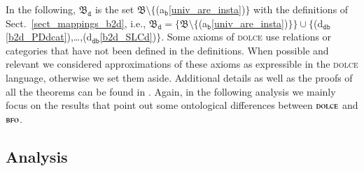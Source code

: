 \documentclass[ao]{iosart2x}
\newcommand{\nb}[1]{\textcolor{red}{$|$}\marginpar{\hspace*{-0cm}\parbox{20mm}{\scriptsize\raggedright\textcolor{red}{#1}}}}
\newcommand{\bfoAxLabel}{\textrm{a$_\texttt{b}$}}
\newcommand{\dbDefLabel}{\textrm{d$_\texttt{db}$}}
\newcommand{\refbfoax}[1]{({\bfoAxLabel}\ref{#1})}
\newcommand{\refdbdf}[1]{({\dbDefLabel}\ref{#1})}
\newcommand{\dolce}{{\textsc{dolce}}}
\newcommand{\bfo}{{\textsc{bfo}}}
\newcommand {\thbfo} {\ensuremath{\mathfrak{B}}}
\newcommand {\dbmap} {\ensuremath{\mathfrak{M}_\texttt{db}}}
\newcommand {\bdmap} {\ensuremath{\mathfrak{M}_\texttt{bd}}}
\newcommand {\thbfobdmap} {\ensuremath{\mathfrak{B}_\texttt{d}}}
\begin{document}
In the following, $\thbfobdmap$ is the set $\thbfo{\setminus}\{$\refbfoax{univ_are_insta}$\}$ with the definitions of Sect.~\ref{sect_mappings_b2d}, %
i.e., $\thbfobdmap = \{\thbfo{\setminus}\{$\refbfoax{univ_are_insta}$\}\} \cup \{$\refdbdf{b2d_PDdcat},\ldots,\refdbdf{b2d_SLCd}$\}$. %
%
%
%
Some axioms of {\dolce} use relations or categories that have not been defined in the definitions. When possible and relevant we considered approximations of these axioms as expressible in the {\dolce} language, otherwise we set them aside. Additional details as well as the proofs of all the theorems can be found in \citep{D24}. Again, in the following analysis we mainly focus on the results that point out some ontological differences between $\dolce$ and $\bfo$. 





\subsection{Analysis}\label{sect_analysis_b2d}
\end{document}
